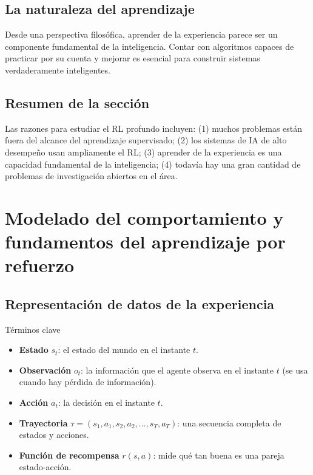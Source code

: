 \documentclass[a4paper]{article}
\begin{document}
\subsection{La naturaleza del aprendizaje}

Desde una perspectiva filosófica, aprender de la experiencia parece ser un componente fundamental de la inteligencia. Contar con algoritmos capaces de practicar por su cuenta y mejorar es esencial para construir sistemas verdaderamente inteligentes.

\subsection{Resumen de la sección}

Las razones para estudiar el RL profundo incluyen: (1) muchos problemas están fuera del alcance del aprendizaje supervisado; (2) los sistemas de IA de alto desempeño usan ampliamente el RL; (3) aprender de la experiencia es una capacidad fundamental de la inteligencia; (4) todavía hay una gran cantidad de problemas de investigación abiertos en el área.

\section{Modelado del comportamiento y fundamentos del aprendizaje por refuerzo}

\subsection{Representación de datos de la experiencia}

\begin{importantbox}{Términos clave}
\begin{itemize}
    \item \textbf{Estado} $s_t$: el estado del mundo en el instante $t$.
    \item \textbf{Observación} $o_t$: la información que el agente observa en el instante $t$ (se usa cuando hay pérdida de información).
    \item \textbf{Acción} $a_t$: la decisión en el instante $t$.
    \item \textbf{Trayectoria} $\tau = (s_1, a_1, s_2, a_2, \ldots, s_T, a_T)$: una secuencia completa de estados y acciones.
    \item \textbf{Función de recompensa} $r(s, a)$: mide qué tan buena es una pareja estado-acción.
\end{itemize}
\end{importantbox}
\end{document}
